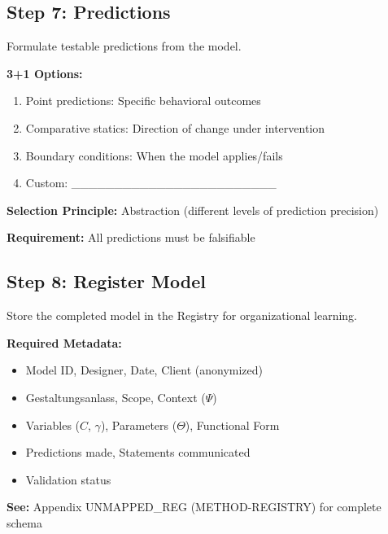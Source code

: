 \subsection{Step 7: Predictions}

Formulate testable predictions from the model.

\begin{tcolorbox}[colback=white, colframe=black,
    title=Step 7: Prediction Formulation]
\textbf{3+1 Options:}
\begin{enumerate}
\item[$\square$] Point predictions: Specific behavioral outcomes
\item[$\square$] Comparative statics: Direction of change under intervention
\item[$\square$] Boundary conditions: When the model applies/fails
\item[$\square$] Custom: \_\_\_\_\_\_\_\_\_\_\_\_\_\_\_\_\_\_\_\_\_\_\_\_
\end{enumerate}

\textbf{Selection Principle:} Abstraction (different levels of prediction precision)

\textbf{Requirement:} All predictions must be falsifiable
\end{tcolorbox}

\subsection{Step 8: Register Model}

Store the completed model in the Registry for organizational learning.

\begin{tcolorbox}[colback=white, colframe=black,
    title=Step 8: Model Registration]
\textbf{Required Metadata:}
\begin{itemize}[nosep]
\item Model ID, Designer, Date, Client (anonymized)
\item Gestaltungsanlass, Scope, Context ($\Psi$)
\item Variables ($C$, $\gamma$), Parameters ($\Theta$), Functional Form
\item Predictions made, Statements communicated
\item Validation status
\end{itemize}

\textbf{See:} Appendix UNMAPPED_REG (METHOD-REGISTRY) for complete schema
\end{tcolorbox}


